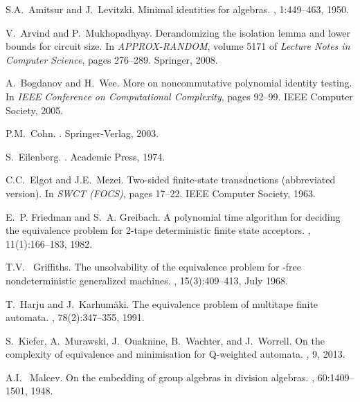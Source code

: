 \documentclass[runningheads]{llncs}
\begin{document}
 

\begin{thebibliography}{10}

S.A.~Amitsur and J.~Levitzki.
\newblock Minimal identities for algebras.
, 1:449--463,
  1950.

V.~Arvind and P.~Mukhopadhyay.
\newblock Derandomizing the isolation lemma and lower bounds for circuit size.
\newblock In {\em APPROX-RANDOM}, volume 5171 of {\em Lecture Notes in Computer
  Science}, pages 276--289. Springer, 2008.

A.~Bogdanov and H.~Wee.
\newblock More on noncommutative polynomial identity testing.
\newblock In {\em IEEE Conference on Computational Complexity}, pages 92--99.
  IEEE Computer Society, 2005.

P.M.~Cohn.
.
\newblock Springer-Verlag, 2003.

S.~Eilenberg.
.
\newblock Academic Press, 1974.

C.C.~Elgot and J.E.~Mezei.
\newblock Two-sided finite-state transductions (abbreviated version).
\newblock In {\em SWCT (FOCS)}, pages 17--22. IEEE Computer Society, 1963.

E.~P. Friedman and S.~A. Greibach.
\newblock A polynomial time algorithm for deciding the equivalence problem for
  2-tape deterministic finite state acceptors.
, 11(1):166--183, 1982.

T.V.~ Griffiths.
\newblock The unsolvability of the equivalence problem for -free
  nondeterministic generalized machines.
, 15(3):409--413, July 1968.

T.~Harju and J.~Karhum{\"a}ki.
\newblock The equivalence problem of multitape finite automata.
, 78(2):347--355, 1991.

S.~Kiefer, A.~Murawski, J.~Ouaknine, B.~Wachter, and J.~Worrell.
\newblock On the complexity of equivalence and minimisation for {Q}-weighted
  automata.
, 9, 2013.

A.I.~ Malcev.
\newblock On the embedding of group algebras in division algebras.
, 60:1409--1501, 1948.


\end{thebibliography}
\end{document}
